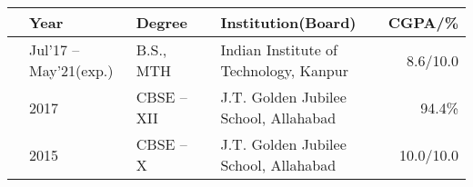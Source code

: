 
\newcommand{\education}[4]{
  & #1 & #2 & &#3 & #4
}
\begin{center}
\begin{tabular}{ | L{0.05cm} l | L{3cm} | L{0.05cm} C{8cm} | r |}
  \hline
  \education{\textbf{Year}}{\textbf{Degree}}{\textbf{Institution(Board)}}{\textbf{CGPA/\%}}\\
  \hline
  \education{Jul'17 -- May'21(exp.)}{B.S., MTH}{Indian Institute of Technology, Kanpur}{8.6/10.0}\\
  \education{2017}{CBSE -- XII}{J.T. Golden Jubilee School, Allahabad}{94.4\%}\\
  \education{2015}{CBSE -- X}{J.T. Golden Jubilee School, Allahabad}{10.0/10.0}\\
  \hline
\end{tabular}
\end{center}
\vspace{-4mm}
